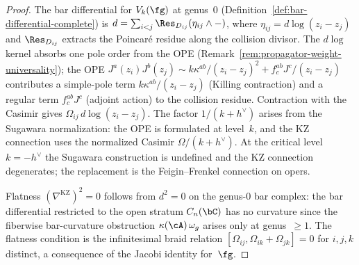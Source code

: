 \begin{proof}
The bar differential for $V_k(\fg)$ at genus~$0$
(Definition~\ref{def:bar-differential-complete}) is
$d = \sum_{i<j} \Res_{D_{ij}} (\eta_{ij} \wedge -)$, where
$\eta_{ij} = d\log(z_i-z_j)$ and $\Res_{D_{ij}}$ extracts the Poincar\'e
residue along the collision divisor. The $d\log$ kernel absorbs one pole order
from the OPE (Remark~\ref{rem:propagator-weight-universality}); the OPE
$J^a(z_i) J^b(z_j) \sim k\kappa^{ab}/(z_i-z_j)^2 + f^{ab}_c J^c/(z_i-z_j)$
contributes a simple-pole term $k\kappa^{ab}/(z_i-z_j)$ (Killing contraction)
and a regular term $f^{ab}_c J^c$ (adjoint action) to the collision residue.
Contraction with the Casimir gives $\Omega_{ij}\,d\log(z_i-z_j)$. The factor
$1/(k+h^\vee)$ arises from the Sugawara normalization: the OPE is formulated
at level~$k$, and the KZ connection uses the normalized Casimir
$\Omega/(k+h^\vee)$. At the critical level $k = -h^\vee$ the Sugawara
construction is undefined and the KZ connection degenerates; the replacement
is the Feigin--Frenkel connection on opers.

Flatness $(\nabla^{\mathrm{KZ}})^2 = 0$ follows from $d^2 = 0$ on the genus-$0$
bar complex: the bar differential restricted to the open stratum $C_n(\bC)$
has no curvature since the fiberwise bar-curvature obstruction $\kappa(\cA)\,\omega_g$
arises only at genus~$\geq 1$. The flatness
condition is the infinitesimal braid relation
$[\Omega_{ij}, \Omega_{ik} + \Omega_{jk}] = 0$ for $i,j,k$ distinct, a
consequence of the Jacobi identity for~$\fg$.
\end{proof}

